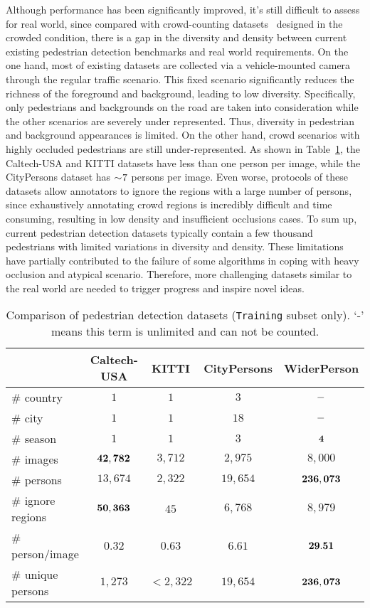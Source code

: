 \documentclass[journal]{IEEEtran}
\begin{document}
Although performance has been significantly improved, it's still difficult to assess for real world, since compared with crowd-counting datasets~\cite{DBLP:conf/cvpr/IdreesSSS13,DBLP:conf/cvpr/ShaoKLW15} designed in the crowded condition, there is a gap in the diversity and density between current existing pedestrian detection benchmarks and real world requirements. On the one hand, most of existing datasets are collected via a vehicle-mounted camera through the regular traffic scenario. This fixed scenario significantly reduces the richness of the foreground and background, leading to low diversity. Specifically, only pedestrians and backgrounds on the road are taken into consideration while the other scenarios are severely under represented. Thus, diversity in pedestrian and background appearances is limited. On the other hand, crowd scenarios with highly occluded pedestrians are still under-represented. As shown in Table~\ref{tab:dataset_statistics}, the Caltech-USA and KITTI datasets have less than one person per image, while the CityPersons dataset has $\sim\negmedspace 7$ persons per image. Even worse, protocols of these datasets allow annotators to ignore the regions with a large number of persons, since exhaustively annotating crowd regions is incredibly difficult and time consuming, resulting in low density and insufficient occlusions cases. To sum up, current pedestrian detection datasets typically contain a few thousand pedestrians with limited variations in diversity and density. These limitations have partially contributed to the failure of some algorithms in coping with heavy occlusion and atypical scenario. Therefore, more challenging datasets similar to the real world are needed to trigger progress and inspire novel ideas.

\begin{table}[t]
\caption{Comparison of pedestrian detection datasets ({\tt Training} subset only). `-' means this term is unlimited and can not be counted.}
\centering
\begin{tabular}{l|cccc}
\toprule[2pt]
 & \scriptsize{Caltech-USA} & \scriptsize{KITTI} & \scriptsize{CityPersons} & \scriptsize{WiderPerson} \\
\midrule[1pt]
\# country & $1$ & $1$ & $3$ & $\bf{-}$ \\
\# city & $1$ & $1$ & $18$ & $\bf{-}$ \\
\# season & $1$ & $1$ & $3$ & $\bf{4}$ \\
\# images & $\bf{42,782}$ & $3,712$ & $2,975$ & $8,000$ \\
\# persons & $13,674$ & $2,322$ & $19,654$ & $\bf{236,073}$ \\
\# ignore regions & $\bf{50,363}$ & $45$ & $6,768$ & $8,979$ \\
\# person/image & $0.32$ & $0.63$ & $6.61$ & $\bf{29.51}$ \\
\# unique persons & $1,273$ & $< 2,322$ & $19,654$ & $\bf{236,073}$ \\
\bottomrule[2pt]
\end{tabular}
\label{tab:dataset_statistics}
\end{table}
\end{document}
